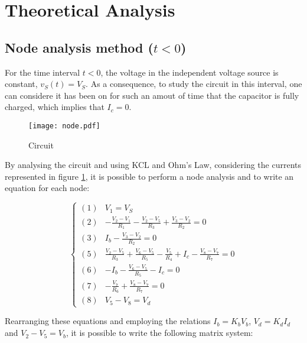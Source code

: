 \section{Theoretical Analysis}
\label{sec:analysis}

\subsection{Node analysis method ($t < 0$)}
\label{sec:node}

For the time interval $t < 0$, the voltage in the independent voltage source is constant, $v_S(t) = V_S$. As a consequence, to study the circuit in this interval, one can considere it has been on for such an amout of time  that the capacitor is fully charged, which implies that $I_c = 0$.

\begin{figure}[H]
  \centering
  \texttt{[image: node.pdf]}
  \caption{Circuit}
  \label{1node_fig}
\end{figure}

By analysing the circuit and using KCL and Ohm's Law, considering the currents represented in figure \ref{1node_fig}, it is possible to perform a node analysis and to write an equation for each node:

\begin{equation}
  \begin{cases}
    (1) & V_1 = V_S \\
    (2) & -\frac{V_2-V_1}{R_1} - \frac{V_2-V_5}{R_3} + \frac{V_3-V_2}{R_2} = 0 \\
    (3) & I_b - \frac{V_3-V_2}{R_2} = 0 \\
    (5) & \frac{V_2-V_5}{R_3} + \frac{V_6-V_5}{R_5} - \frac{V_5}{R_4} + I_c - \frac{V_8-V_7}{R_7} = 0 \\
    (6) & -I_b - \frac{V_6-V_5}{R_5} - I_c = 0 \\
    (7) & -\frac{V_7}{R_6} + \frac{V_8-V_7}{R_7} = 0 \\
    (8) & V_5-V_8 = V_d
  \end{cases}
\end{equation}

Rearranging these equations and employing the relations $I_b = K_bV_b$, $V_d = K_dI_d$ and $V_2-V_5 = V_b$, it is possible to write the following matrix system:

